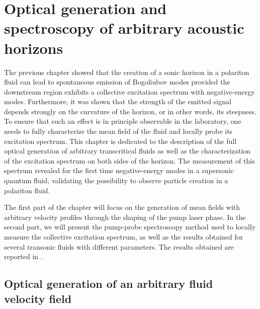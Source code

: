 

\renewcommand{\floatpagefraction}{0.7}   %
\renewcommand{\textfraction}{0.1}
\renewcommand{\topfraction}{0.9}
\setcounter{topnumber}{2}
\setcounter{totalnumber}{2}

\graphicspath{{./}{./fig/}{./chap_custom_st/fig/}}

\chapter{Optical generation and spectroscopy of arbitrary acoustic horizons}

\label{chap:generation_transonic_fluid}


The previous chapter showed that the creation of a sonic horizon in a polariton fluid can lead to spontaneous emission of Bogoliubov modes provided the downstream region exhibits a collective excitation spectrum with
negative-energy modes. Furthermore, it was shown that the strength of the emitted signal depends strongly on the curvature of the horizon, or in other words, its steepness. To ensure that such an effect is in principle observable in the laboratory, one needs to fully characterize the mean field of the fluid and locally probe its excitation spectrum. This chapter is dedicated to the description of the full optical generation of arbitrary transcritical fluids as well as the characterization of the excitation spectrum on both sides of the horizon. 
The measurement of this spectrum revealed for the first time negative-energy modes in a supersonic quantum fluid, validating the possibility to observe particle creation in a polariton fluid.

The first part of the chapter will focus on the generation of mean fields with arbitrary velocity profiles through the shaping of the pump laser phase. In the second part, we will present the pump-probe spectroscopy method used to locally measure the collective excitation spectrum, as well
as the results obtained for several transonic fluids with different parameters. The results obtained are reported in \cite{falque2024polaritonfluidsquantumfield}.

\section{Optical generation of an arbitrary fluid velocity field}


